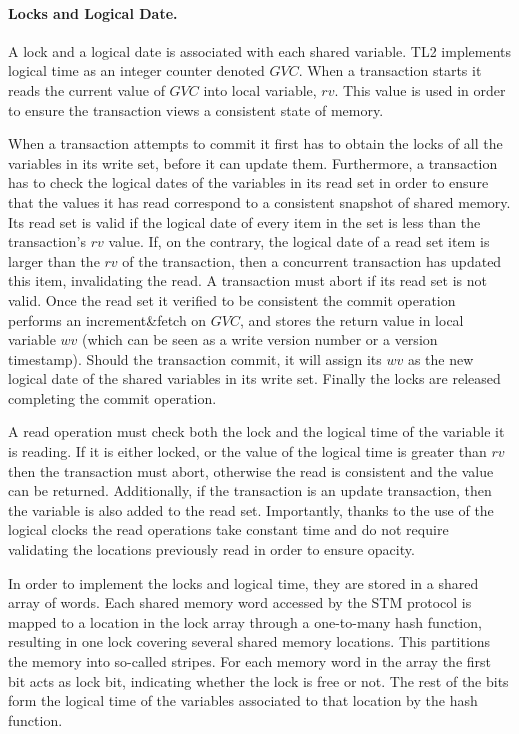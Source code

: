 \paragraph{Locks and Logical Date.}
A lock and a logical date is associated with each shared variable.  
TL2 implements logical time as an integer counter denoted $\mathit{GVC}$.
When a transaction starts it reads the current value of $\mathit{GVC}$ into local variable, $\mathit{rv}$. 
This value is used in order to ensure the transaction views a consistent state of memory.

When a transaction attempts to commit it  first  has to  obtain  the  locks  of all the
variables in its write set, before it can  
update them.
Furthermore, a  transaction has to  check the logical dates  of the
variables in its read set in  
order to  ensure that  the values  it has read  correspond to  a consistent
snapshot of shared memory.
Its read set is valid if the logical date of every  item in the set is less than the transaction{}'s $\mathit{rv}$  value. 
If, on the  contrary, the logical date of a read set  item is larger than the $\mathit{rv}$ 
of the transaction,  then  a concurrent  transaction 
has updated this item, invalidating the read.
A transaction must abort if its read set is not valid.  
Once the read set it verified to be consistent the commit operation performs an increment\&fetch on $\mathit{GVC}$, and stores the 
return value in local variable $\mathit{wv}$ (which can be seen as a write version number  or a version timestamp). 
Should the transaction commit, it will assign its $\mathit{wv}$ as the new logical date of the shared variables in its write set.
Finally the locks are released completing the commit operation.

A read operation must check both the lock and the logical time of the variable it is reading.
If it is either locked, or the value of the logical time is greater than $\mathit{rv}$ then the transaction must abort,
otherwise the read is consistent and the value can be returned.
Additionally, if the transaction is an update transaction, then the variable is also added to the read set.
Importantly, thanks to the use of the logical clocks the read operations take constant time
and do not require validating the locations previously read in order to ensure opacity.

In order to implement the locks and logical time, they  are stored in  a shared array
of words.
Each shared memory  word accessed by the STM protocol is
mapped to a location in the lock array through a  
one-to-many hash function,  resulting in one
lock covering several shared  
memory locations. This  partitions the memory into  so-called stripes. 
For each memory word in the array
the first bit acts as lock  bit, indicating whether the lock  is free or
not. The rest of the bits form the  
logical time of the variables associated to that location by the hash function.


